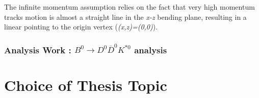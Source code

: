 \documentclass[paper=a4, fontsize=10pt]{scrartcl}
\numberwithin{equation}{section}		%
\numberwithin{figure}{section}			%
\numberwithin{table}{section}				%
\begin{document}
The infinite momentum assumption relies on the fact that very high momentum tracks motion is almost a straight line in the \textit{x-z} bending plane, resulting in a linear pointing to the origin vertex (\textit{(x,z)=(0,0)}).




\subsubsection{Analysis Work : $B^{0}\rightarrow D^{0}\overline{D}^{0}K^{\ast 0}$ analysis}
 


\section{Choice of Thesis Topic}
\end{document}
